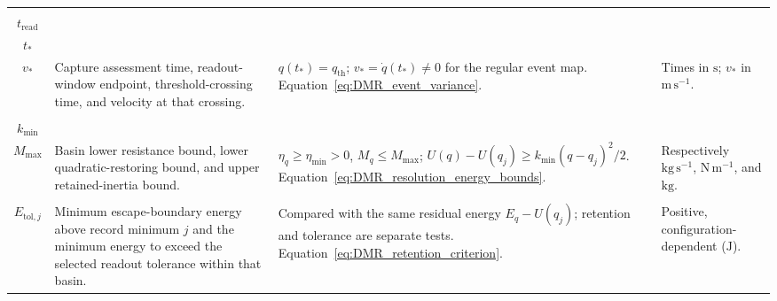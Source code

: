 \begin{longtable}{@{} c p{5.5cm} p{4cm} p{3.5cm} @{}}
\begin{tabular}[c]{@{}c@{}}$t_c$ \\ $t_{\mathrm{read}}$ \\ $t_*$ \\ $v_*$\end{tabular} & {\raggedright Capture assessment time, readout-window endpoint, threshold-crossing time, and velocity at that crossing.\par} & {\raggedright $q(t_*)=q_{\mathrm{th}}$; $v_*=\dot q(t_*)\ne0$ for the regular event map. \newline Equation~\eqref{eq:DMR_event_variance}.\par} & {\raggedright Times in $\mathrm s$; $v_*$ in $\mathrm{m\,s^{-1}}$.\par} \\

\begin{tabular}[c]{@{}c@{}}$\eta_{\min}$ \\ $k_{\min}$ \\ $M_{\max}$\end{tabular} & {\raggedright Basin lower resistance bound, lower quadratic-restoring bound, and upper retained-inertia bound.\par} & {\raggedright $\eta_q\geq\eta_{\min}>0$, $M_q\leq M_{\max}$; $U(q)-U(q_j)\geq k_{\min}(q-q_j)^2/2$. \newline Equation~\eqref{eq:DMR_resolution_energy_bounds}.\par} & {\raggedright Respectively $\mathrm{kg\,s^{-1}}$, $\mathrm{N\,m^{-1}}$, and $\mathrm{kg}$.\par} \\

\begin{tabular}[c]{@{}c@{}}$\Delta U_{\mathrm{esc},j}$ \\ $E_{\mathrm{tol},j}$\end{tabular} & {\raggedright Minimum escape-boundary energy above record minimum $j$ and the minimum energy to exceed the selected readout tolerance within that basin.\par} & {\raggedright Compared with the same residual energy $E_q-U(q_j)$; retention and tolerance are separate tests. \newline Equation~\eqref{eq:DMR_retention_criterion}.\par} & {\raggedright Positive, configuration-dependent ($\mathrm J$).\par} \\

\bottomrule
\end{longtable}
